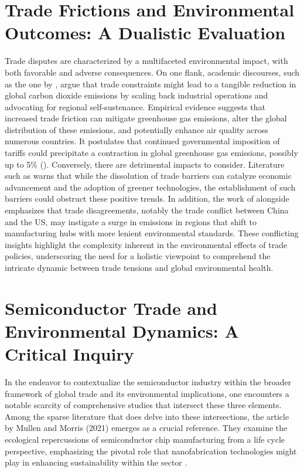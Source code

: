 \section{Trade Frictions and Environmental Outcomes: A Dualistic Evaluation}
Trade disputes are characterized by a multifaceted environmental impact, with both favorable and adverse consequences. On one flank, academic discourses, such as the one by , argue that trade constraints might lead to a tangible reduction in global carbon dioxide emissions by scaling back industrial operations and advocating for regional self-sustenance. Empirical evidence suggests that increased trade friction can mitigate greenhouse gas emissions, alter the global distribution of these emissions, and potentially enhance air quality across numerous countries. It postulates that continued governmental imposition of tariffs could precipitate a contraction in global greenhouse gas emissions, possibly up to 5\% (). Conversely, there are detrimental impacts to consider. Literature such as  warns that while the dissolution of trade barriers can catalyze economic advancement and the adoption of greener technologies, the establishment of such barriers could obstruct these positive trends. In addition, the work of  alongside  emphasizes that trade disagreements, notably the trade conflict between China and the US, may instigate a surge in emissions in regions that shift to manufacturing hubs with more lenient environmental standards. These conflicting insights highlight the complexity inherent in the environmental effects of trade policies, underscoring the need for a holistic viewpoint to comprehend the intricate dynamic between trade tensions and global environmental health.

\section{Semiconductor Trade and Environmental Dynamics: A Critical Inquiry}
In the endeavor to contextualize the semiconductor industry within the broader framework of global trade and its environmental implications, one encounters a notable scarcity of comprehensive studies that intersect these three elements. Among the sparse literature that does delve into these intersections, the article by Mullen and Morris (2021)\cite{WOS:000657017300001} emerges as a crucial reference. They examine the ecological repercussions of semiconductor chip manufacturing from a life cycle perspective, emphasizing the pivotal role that nanofabrication technologies might play in enhancing sustainability within the sector .

